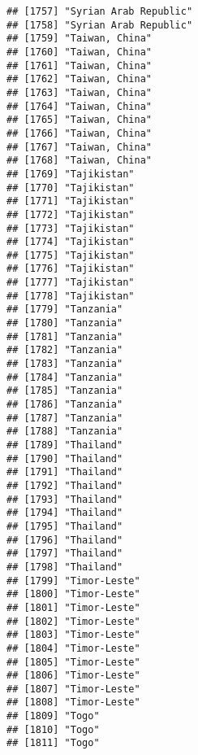 \documentclass[]{article}
\begin{document}
\begin{verbatim}
## [1757] "Syrian Arab Republic"               
## [1758] "Syrian Arab Republic"               
## [1759] "Taiwan, China"                      
## [1760] "Taiwan, China"                      
## [1761] "Taiwan, China"                      
## [1762] "Taiwan, China"                      
## [1763] "Taiwan, China"                      
## [1764] "Taiwan, China"                      
## [1765] "Taiwan, China"                      
## [1766] "Taiwan, China"                      
## [1767] "Taiwan, China"                      
## [1768] "Taiwan, China"                      
## [1769] "Tajikistan"                         
## [1770] "Tajikistan"                         
## [1771] "Tajikistan"                         
## [1772] "Tajikistan"                         
## [1773] "Tajikistan"                         
## [1774] "Tajikistan"                         
## [1775] "Tajikistan"                         
## [1776] "Tajikistan"                         
## [1777] "Tajikistan"                         
## [1778] "Tajikistan"                         
## [1779] "Tanzania"                           
## [1780] "Tanzania"                           
## [1781] "Tanzania"                           
## [1782] "Tanzania"                           
## [1783] "Tanzania"                           
## [1784] "Tanzania"                           
## [1785] "Tanzania"                           
## [1786] "Tanzania"                           
## [1787] "Tanzania"                           
## [1788] "Tanzania"                           
## [1789] "Thailand"                           
## [1790] "Thailand"                           
## [1791] "Thailand"                           
## [1792] "Thailand"                           
## [1793] "Thailand"                           
## [1794] "Thailand"                           
## [1795] "Thailand"                           
## [1796] "Thailand"                           
## [1797] "Thailand"                           
## [1798] "Thailand"                           
## [1799] "Timor-Leste"                        
## [1800] "Timor-Leste"                        
## [1801] "Timor-Leste"                        
## [1802] "Timor-Leste"                        
## [1803] "Timor-Leste"                        
## [1804] "Timor-Leste"                        
## [1805] "Timor-Leste"                        
## [1806] "Timor-Leste"                        
## [1807] "Timor-Leste"                        
## [1808] "Timor-Leste"                        
## [1809] "Togo"                               
## [1810] "Togo"                               
## [1811] "Togo"                               

\end{verbatim}
\end{document}
